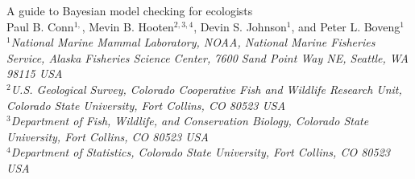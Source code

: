 \documentclass[12pt,english]{article}
\begin{document}
\begin{spacing}{1.9}


\begin{center}
A guide to Bayesian model checking for ecologists
\bigskip\\
\normalsize
{\sc Paul B. Conn$^{1,}$\footnotemark[5], Mevin B. Hooten$^{2,3,4}$,
Devin S. Johnson$^1$, and Peter L. Boveng$^1$}\smallskip\\
$^1${\em National Marine Mammal Laboratory, NOAA, National Marine Fisheries Service,
Alaska Fisheries Science Center, 7600 Sand Point Way NE, Seattle,
WA 98115 USA }\\ \medskip
$^2${\em U.S. Geological Survey, Colorado Cooperative Fish and Wildlife Research Unit, Colorado State University, Fort Collins, CO 80523 USA }\\ \medskip
$^3${\em Department of Fish, Wildlife, and Conservation Biology, Colorado State University, Fort Collins, CO 80523 USA }\\ \medskip
$^4${\em Department of Statistics, Colorado State University, Fort Collins, CO 80523 USA }\\ \medskip
\end{center}


\raggedright \setlength{\parindent}{0.3in}
{}

\linenumbers


\end{spacing}
\end{document}
